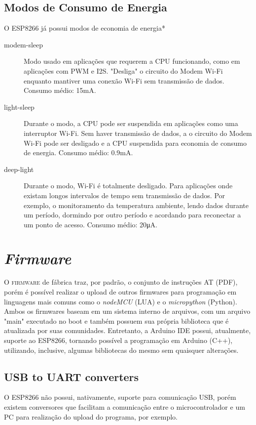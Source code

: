 \documentclass[
	10pt,				%
	openright,			%
	twoside,			%
	a5paper,			%
	english,			%
	french,				%
	spanish,			%
	brazil,				%
	sumario=tradicional
]{abntex2}
\begin{document}
\section{Modos de Consumo de Energia}
O ESP8266 já possui modos de economia de energia* 
\begin{description}
\item[modem-sleep] Modo usado em aplicações que requerem a CPU funcionando, como em aplicações com PWM e I2S. "Desliga" o circuito do Modem Wi-Fi enquanto mantiver uma conexão Wi-Fi sem transmissão de dados. Consumo médio: 15mA.
\item[light-sleep] Durante o modo, a CPU pode ser suspendida em aplicações como uma interruptor Wi-Fi. Sem haver transmissão de dados, a o circuito do Modem Wi-Fi pode ser desligado e a CPU suspendida para economia de consumo de energia. Consumo médio: 0.9mA.
\item [deep-light] Durante o modo, Wi-Fi é totalmente desligado. Para aplicações onde existam longos intervalos de tempo sem transmissão de dados. Por exemplo, o monitoramento da temperatura ambiente, lendo dados durante um período, dormindo por outro período e acordando para reconectar a um ponto de acesso. Consumo médio: 20μA.

\end{description}
       


\chapter{\textit{Firmware}}

\lettrine[nindent=0.35em,lhang=0.40,loversize=0.3]{O}{ firmware} de fábrica traz, por padrão, o conjunto de instruções AT (PDF), porém é possível realizar o upload de outros firmwares para programação em linguagens mais comuns como o \textit{nodeMCU} (LUA) e o \textit{micropython} (Python). Ambos os firmwares baseam em um sistema interno de arquivos, com um arquivo "main" executado no boot e também possuem sua própria biblioteca que é atualizada por suas comunidades. 
Entretanto, a Arduino IDE possui, atualmente, suporte ao ESP8266, tornando possível a programação em Arduino (C++), utilizando, inclusive, algumas bibliotecas do mesmo sem quaisquer alterações.

\section{USB to UART converters}
        O ESP8266 não possui, nativamente, suporte para comunicação USB, porém existem conversores que facilitam a comunicação entre o microcontrolador e um PC para realização do upload do programa, por exemplo. 
\end{document}
